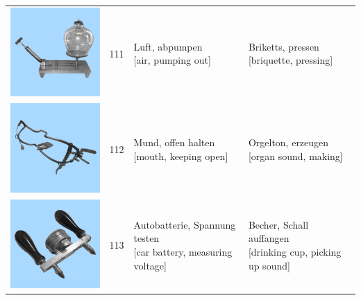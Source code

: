 \documentclass[
  english,
  doc,12pt,twoside,floatsintext]{apa7}
\begin{document}
\begin{center}
\begin{ThreePartTable}
{\begin{longtable}{llll}
\includegraphics[valign=c, scale=0.23]{../materials/unfamiliar/111.png} & 111 & \makecell[l]{Luft, abpumpen\\{[air, pumping out]}} & \makecell[l]{Briketts, pressen\\{[briquette, pressing]}}\\
\includegraphics[valign=c, scale=0.23]{../materials/unfamiliar/112.png} & 112 & \makecell[l]{Mund, offen halten\\{[mouth, keeping open]}} & \makecell[l]{Orgelton, erzeugen\\{[organ sound, making]}}\\
\includegraphics[valign=c, scale=0.23]{../materials/unfamiliar/113.png} & 113 & \makecell[l]{Autobatterie, Spannung testen\\{[car battery, measuring voltage]}} & \makecell[l]{Becher, Schall auffangen\\{[drinking cup, picking up sound]}}\\

\end{longtable}}
\end{ThreePartTable}
\end{center}
\end{document}
